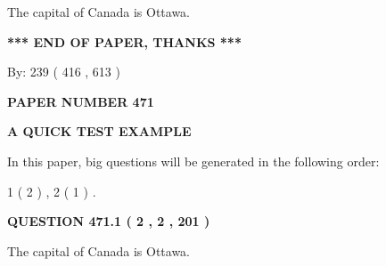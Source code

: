 \documentclass[12pt]{article}
\begin{document}
  
 
 
\noindent{}
 
 
The capital of Canada is Ottawa.
 
 
 
 
   
   
 \vspace{0.2in}
 
   
   
   
   
\vspace{1.0in} 
{\textbf{\large{ *** END OF PAPER, THANKS *** }}} 
   
   
\hspace{1.0in} By: 
 239 ( 416 ,  613 )
   
   
   
   
\newpage 
\setcounter{page}{ 
   471001 } 
   
   
   
   
 {\textbf{ \Large{ PAPER NUMBER  471  }}}
   
   
\vspace{0.2in}
   
   
   
   
   
   
 \vspace{0.2in}
{\LARGE {\textbf{ A QUICK TEST EXAMPLE}}}
   
   
   
\vspace{0.2in}
   
In this paper, big questions will be generated in the following order: 
   
   
   1 ( 2 )
 ,
   2 ( 1 )
 .
  
\vspace{0.2in}
  
{\textbf{\Large{QUESTION
471.1 
 ( 2 , 2 , 201 )
}}}
  
  
 
 
\noindent{}
 
 
The capital of Canada is Ottawa.
 
 
 
 
  
\vspace{0.2in}
  
\end{document}
